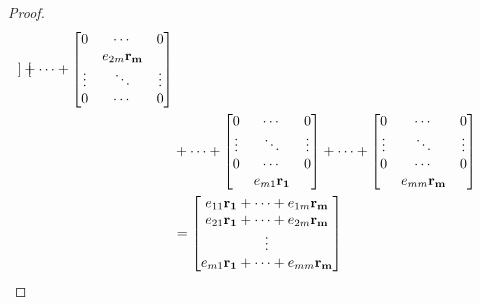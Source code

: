\documentclass[../main.tex]{subfiles}
\begin{document}
\begin{proof}
\begin{align*}
\begin{bmatrix}
		\end{bmatrix}+\cdots+
		\begin{bmatrix}
			0      & \cdots           & 0      \\
			       & e_{2m}\mathbf{r_m} &        \\
			\vdots & \ddots           & \vdots \\
			0      & \cdots           & 0
		\end{bmatrix}                                                                \\
		                 & +\cdots+\begin{bmatrix}
			                           0      & \cdots           & 0      \\
			                           \vdots & \ddots           & \vdots \\
			                           0      & \cdots           & 0      \\
			                                  & e_{m1}\mathbf{r_1} &
		                           \end{bmatrix}+\cdots+
		\begin{bmatrix}
			0      & \cdots           & 0      \\
			\vdots & \ddots           & \vdots \\
			0      & \cdots           & 0      \\
			       & e_{mm}\mathbf{r_m} &
		\end{bmatrix}                                                                \\
		                 & =\begin{bmatrix}
			                    e_{11}\mathbf{r_1}+\cdots+e_{1m}\mathbf{r_m} \\
			                    e_{21}\mathbf{r_1}+\cdots+e_{2m}\mathbf{r_m} \\
			                    \vdots                                   \\
			                    e_{m1}\mathbf{r_1}+\cdots+e_{mm}\mathbf{r_m}
		                    \end{bmatrix}
	\end{align*}
\end{proof}
\end{document}
